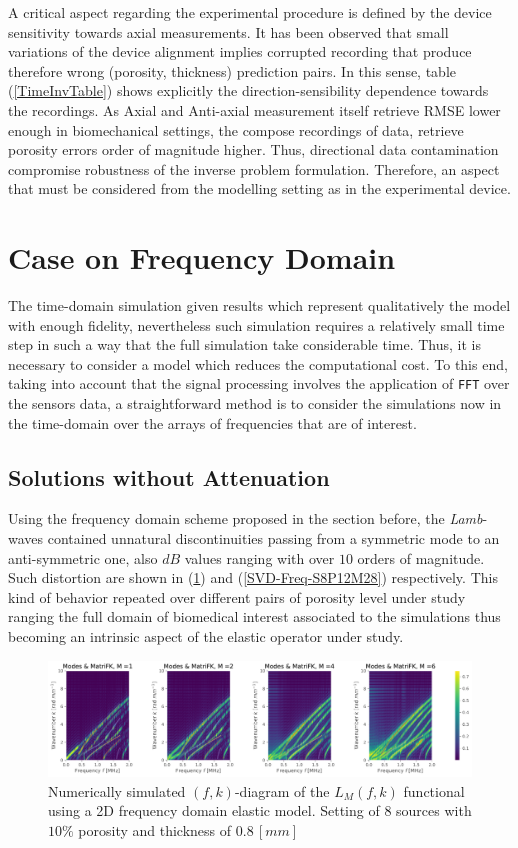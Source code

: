 A critical aspect regarding the experimental procedure is defined by the device sensitivity towards axial measurements. It has been observed that small variations of the device alignment implies corrupted recording that produce therefore wrong (porosity, thickness) prediction pairs.
In this sense, table (\ref{TimeInvTable}) shows explicitly the direction-sensibility dependence towards the recordings. As Axial and Anti-axial measurement itself retrieve RMSE lower enough in biomechanical settings, the compose recordings of data, retrieve porosity errors order of magnitude higher. Thus, directional data contamination compromise robustness of the inverse problem formulation. Therefore, an aspect that must be considered from the modelling setting as in the experimental device.


\section{Case on Frequency Domain}

The time-domain simulation given results which represent qualitatively the model with enough fidelity, nevertheless such simulation requires a relatively small time step in such a way that the full simulation take considerable time. Thus, it is necessary to consider a model which reduces the computational cost.
To this end, taking into account that the signal processing involves the application of \texttt{FFT} over the sensors data, a straightforward method is to consider the simulations now in the time-domain over the arrays of frequencies that are of interest.

\subsection{Solutions without Attenuation}
Using the frequency domain scheme proposed in the section before, the \textit{Lamb}-waves contained unnatural discontinuities passing from a symmetric mode to an anti-symmetric one, also $dB$ values ranging with over $10$ orders of magnitude. Such distortion are shown in (\ref{FK-Freq-DiagramS8P12M28}) and (\ref{SVD-Freq-S8P12M28}) respectively. This kind of behavior repeated over different pairs of porosity level under study ranging the full domain of biomedical interest associated to the simulations thus becoming an intrinsic aspect of the elastic operator under study.

\begin{figure}[!h]
	\centering
	\includegraphics[width=\textwidth]{images/FreqRes/2DFreqS8P12ElasticFK28M400_y.pdf}
	\caption{Numerically simulated $(f,k)$-diagram of the $L_M(f,k)$ functional using a 2D frequency domain elastic model. Setting of 8 sources with $10\%$ porosity and thickness of $0.8 \,[mm]$}
	\label{FK-Freq-DiagramS8P12M28}
\end{figure} 

